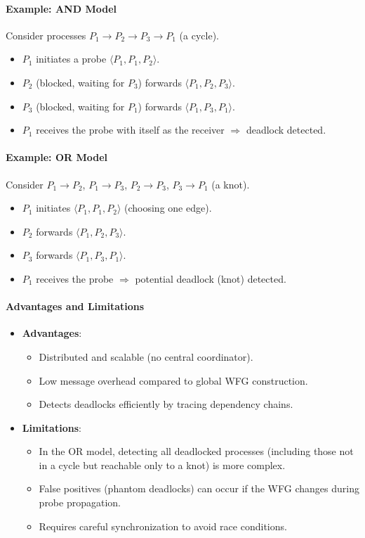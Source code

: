 \paragraph{Example: AND Model}
Consider processes $P_1 \to P_2 \to P_3 \to P_1$ (a cycle). 
\begin{itemize}
   \item $P_1$ initiates a probe $\langle P_1, P_1, P_2 \rangle$.
   \item $P_2$ (blocked, waiting for $P_3$) forwards $\langle P_1, P_2, P_3 \rangle$.
   \item $P_3$ (blocked, waiting for $P_1$) forwards $\langle P_1, P_3, P_1 \rangle$.
   \item $P_1$ receives the probe with itself as the receiver $\Rightarrow$ deadlock detected.
\end{itemize}

\paragraph{Example: OR Model}
Consider $P_1 \to P_2$, $P_1 \to P_3$, $P_2 \to P_3$, $P_3 \to P_1$ (a knot).
\begin{itemize}
   \item $P_1$ initiates $\langle P_1, P_1, P_2 \rangle$ (choosing one edge).
   \item $P_2$ forwards $\langle P_1, P_2, P_3 \rangle$.
   \item $P_3$ forwards $\langle P_1, P_3, P_1 \rangle$.
   \item $P_1$ receives the probe $\Rightarrow$ potential deadlock (knot) detected.
\end{itemize}

\paragraph{Advantages and Limitations}
\begin{itemize}
   \item \textbf{Advantages}:
   \begin{itemize}
      \item Distributed and scalable (no central coordinator).
      \item Low message overhead compared to global WFG construction.
      \item Detects deadlocks efficiently by tracing dependency chains.
   \end{itemize}
   \item \textbf{Limitations}:
   \begin{itemize}
      \item In the OR model, detecting all deadlocked processes (including those not in a cycle but reachable only to a knot) is more complex.
      \item False positives (phantom deadlocks) can occur if the WFG changes during probe propagation.
      \item Requires careful synchronization to avoid race conditions.
   \end{itemize}
\end{itemize}
